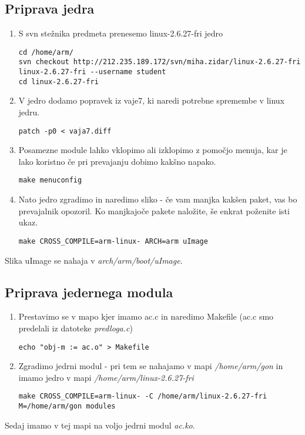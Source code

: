 \documentclass[10pt,a4paper]{article}
\begin{document}
\subsection{Priprava jedra}
\begin{enumerate}
	\item S svn stežnika predmeta prenesemo linux-2.6.27-fri jedro
		\begin{lstlisting}
cd /home/arm/
svn checkout http://212.235.189.172/svn/miha.zidar/linux-2.6.27-fri linux-2.6.27-fri --username student
cd linux-2.6.27-fri
		\end{lstlisting}
	\item V jedro dodamo popravek iz vaje7, ki naredi potrebne spremembe v linux jedru.
		\begin{lstlisting}
patch -p0 < vaja7.diff
		\end{lstlisting}
	\item Posamezne module lahko vklopimo ali izklopimo z pomočjo menuja, kar je lako koristno če pri prevajanju dobimo kakšno napako.
		\begin{lstlisting}
make menuconfig
		\end{lstlisting}
	\item Nato jedro zgradimo in naredimo sliko - če vam manjka kakšen paket, vas bo prevajalnik opozoril. Ko manjkajoče pakete naložite, še enkrat poženite isti ukaz.
		\begin{lstlisting}
make CROSS_COMPILE=arm-linux- ARCH=arm uImage
		\end{lstlisting}
\end{enumerate}
Slika uImage se nahaja v \emph{arch/arm/boot/uImage}.

\subsection{Priprava jedernega modula}
\begin{enumerate}
	\item Prestavimo se v mapo kjer imamo ac.c in naredimo Makefile (ac.c smo predelali iz datoteke \emph{predloga.c})
		\begin{lstlisting}
echo "obj-m := ac.o" > Makefile 
		\end{lstlisting}
	\item Zgradimo jedrni modul - pri tem se nahajamo v mapi \emph{/home/arm/gon} in imamo jedro v mapi \emph{/home/arm/linux-2.6.27-fri}
		\begin{lstlisting}
make CROSS_COMPILE=arm-linux- -C /home/arm/linux-2.6.27-fri M=/home/arm/gon modules
		\end{lstlisting}
\end{enumerate}
Sedaj imamo v tej mapi na voljo jedrni modul \emph{ac.ko}.
\end{document}
